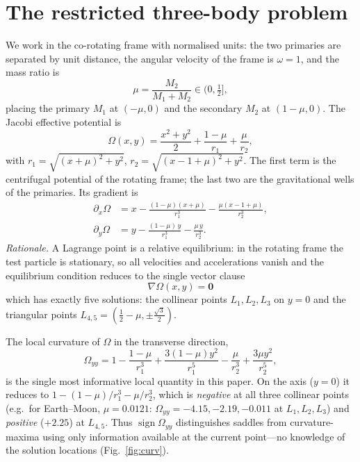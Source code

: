 \documentclass[10pt,twocolumn]{article}
\begin{document}
\section{The restricted three-body problem}\label{sec:rtbp}

We work in the co-rotating frame with normalised units: the two primaries are
separated by unit distance, the angular velocity of the frame is
$\omega=1$, and the mass ratio is
\begin{equation}
  \mu=\frac{M_2}{M_1+M_2}\in(0,\tfrac12],
\end{equation}
placing the primary $M_1$ at $(-\mu,0)$ and the secondary $M_2$ at $(1-\mu,0)$.
The Jacobi effective potential is
\begin{equation}
  \Omega(x,y)=\frac{x^2+y^2}{2}+\frac{1-\mu}{r_1}+\frac{\mu}{r_2},
  \label{eq:omega}
\end{equation}
with $r_1=\sqrt{(x+\mu)^2+y^2}$, $r_2=\sqrt{(x-1+\mu)^2+y^2}$. The first term is
the centrifugal potential of the rotating frame; the last two are the
gravitational wells of the primaries. Its gradient is
\begin{align}
  \partial_x\Omega &= x-\frac{(1-\mu)(x+\mu)}{r_1^3}-\frac{\mu(x-1+\mu)}{r_2^3},
  \label{eq:gx}\\
  \partial_y\Omega &= y-\frac{(1-\mu)\,y}{r_1^3}-\frac{\mu\,y}{r_2^3}.
  \label{eq:gy}
\end{align}
\emph{Rationale.} A Lagrange point is a relative equilibrium: in the rotating
frame the test particle is stationary, so all velocities and accelerations
vanish and the equilibrium condition reduces to the single vector clause
\begin{equation}
  \boxed{\;\nabla\Omega(x,y)=\mathbf 0\;}
  \label{eq:clause}
\end{equation}
which has exactly five solutions: the collinear points $L_1,L_2,L_3$ on $y=0$
and the triangular points $L_{4,5}=(\tfrac12-\mu,\pm\tfrac{\sqrt3}{2})$.

The local curvature of $\Omega$ in the transverse direction,
\begin{equation}
  \Omega_{yy}=1-\frac{1-\mu}{r_1^3}+\frac{3(1-\mu)y^2}{r_1^5}
              -\frac{\mu}{r_2^3}+\frac{3\mu y^2}{r_2^5},
  \label{eq:oyy}
\end{equation}
is the single most informative local quantity in this paper. On the axis
($y=0$) it reduces to $1-(1-\mu)/r_1^3-\mu/r_2^3$, which is \emph{negative} at
all three collinear points (e.g.\ for Earth--Moon, $\mu=0.0121$:
$\Omega_{yy}=-4.15,-2.19,-0.011$ at $L_1,L_2,L_3$) and \emph{positive}
($+2.25$) at $L_{4,5}$. Thus $\operatorname{sign}\Omega_{yy}$ distinguishes
saddles from curvature-maxima using only information available at the current
point---no knowledge of the solution locations
(Fig.~\ref{fig:curv}).
\end{document}
